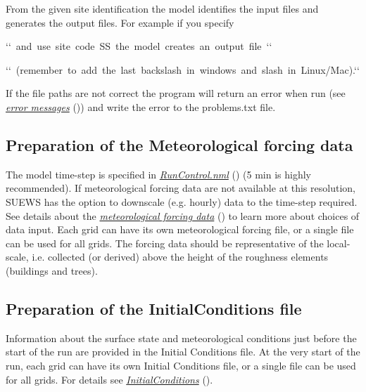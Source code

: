 \documentclass[letterpaper,10pt,english]{sphinxmanual}
\begin{document}
From the given site identification the model identifies the input files
and generates the output files. For example if you specify

\begin{DUlineblock}{0em}
\item[] `{}` and use site code SS the model creates an output file {}`{}`
\item[] `{}` (remember to add the last backslash in windows and slash in Linux/Mac).{}`{}`
\end{DUlineblock}

If the file paths are not correct the program will return an error when
run (see {\hyperref[\detokenize{prepare-to-run-the-model:Error_messages:_problems.txt}]{\emph{error messages}}} ()) and write
the error to the problems.txt file.


\subsection{Preparation of the Meteorological forcing data}
\label{\detokenize{prepare-to-run-the-model:preparation-of-the-meteorological-forcing-data}}
The model time-step is specified in {\hyperref[\detokenize{prepare-to-run-the-model:RunControl.nml}]{\emph{RunControl.nml}}} ()
(5 min is highly recommended). If meteorological forcing data are not
available at this resolution, SUEWS has the option to downscale (e.g.
hourly) data to the time-step required. See details about the
{\hyperref[\detokenize{prepare-to-run-the-model:SSss_YYYY_data_tt.txt}]{\emph{meteorological forcing data}}} () to learn more
about choices of data input. Each grid can have its own meteorological
forcing file, or a single file can be used for all grids. The forcing
data should be representative of the local-scale, i.e. collected (or
derived) above the height of the roughness elements (buildings and
trees).


\subsection{Preparation of the InitialConditions file}
\label{\detokenize{prepare-to-run-the-model:preparation-of-the-initialconditions-file}}
Information about the surface state and meteorological conditions just
before the start of the run are provided in the Initial Conditions file.
At the very start of the run, each grid can have its own Initial
Conditions file, or a single file can be used for all grids. For details
see {\hyperref[\detokenize{prepare-to-run-the-model:InitialConditions}]{\emph{InitialConditions}}} ().
\end{document}
